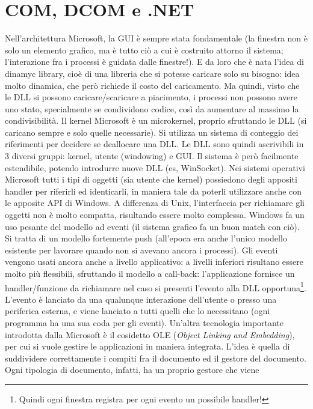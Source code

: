 \section{COM, DCOM e .NET}
Nell'architettura Microsoft, la GUI è sempre stata fondamentale (la finestra non è solo un elemento grafico, ma è tutto
ciò a cui è costruito attorno il sistema; l'interazione fra i processi è guidata dalle finestre!). E da loro che è nata
l'idea di dinamyc library, cioè di una libreria che si potesse caricare solo su bisogno: idea molto dinamica, che però
richiede il costo del caricamento.
Ma quindi, visto che le DLL si possono caricare/scaricare a piacimento, i processi non possono avere uno stato,
specialmente se condividono codice, così  da aumentare al massimo la condivisibilità. Il kernel Microsoft è un
microkernel, proprio sfruttando le DLL (si caricano sempre e solo quelle necessarie).
Si utilizza un sistema di conteggio dei riferimenti per decidere se deallocare una DLL.
Le DLL sono quindi ascrivibili in 3 diversi gruppi: kernel, utente (windowing) e GUI. Il sistema è però facilmente
estendibile, potendo introdurre nuove DLL (es, WinSocket).
Nei sistemi operativi Microsoft tutti i tipi di oggetti (sia utente che kernel) possiedono degli appositi handler per
riferirli ed identicarli, in maniera tale da poterli utilizzare anche con le apposite API di Windows. A differenza di
Unix, l'interfaccia per richiamare gli oggetti non è molto compatta, risultando essere molto complessa.
Windows fa un uso pesante del modello ad eventi (il sistema grafico fa un buon match con ciò). Si tratta di un modello
fortemente push (all'epoca era anche l'unico modello esistente per lavorare quando non si avevano ancora i processi).
Gli eventi vengono usati ancora anche a livello applicativo: a livelli inferiori risultano essere molto più flessibili,
sfruttando il modello a call-back: l'applicazione fornisce un handler/funzione da richiamare nel caso si presenti
l'evento alla DLL opportuna\footnote{Quindi ogni finestra registra per ogni evento un possibile handler!}. L'evento è
lanciato da una qualunque interazione dell'utente o presso una periferica esterna, e viene lanciato a tutti quelli che
lo necessitano (ogni programma ha una sua coda per gli eventi).
Un'altra tecnologia importante introdotta dalla Microsoft è il cosidetto OLE (\textit{Object Linking and Embedding}),
per cui si vuole gestire le applicazioni in maniera integrata. L'idea è quella di suddividere correttamente i compiti
fra il documento ed il gestore del documento. Ogni tipologia di documento, infatti, ha un proprio gestore che viene
